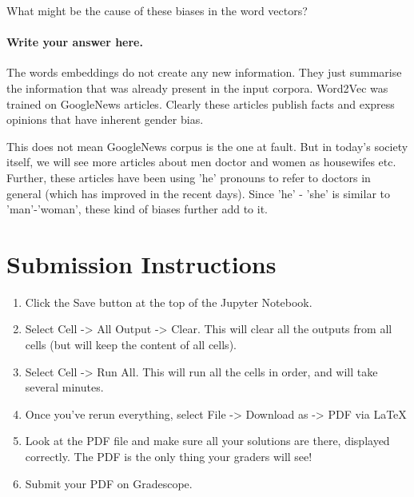 \documentclass[11pt]{article}
\providecommand{\tightlist}{%
      \setlength{\itemsep}{0pt}\setlength{\parskip}{0pt}}
\begin{document}
What might be the cause of these biases in the word vectors?

    \paragraph{Write your answer here.}\label{write-your-answer-here.}

The words embeddings do not create any new information. They just
summarise the information that was already present in the input corpora.
Word2Vec was trained on GoogleNews articles. Clearly these articles
publish facts and express opinions that have inherent gender bias.

This does not mean GoogleNews corpus is the one at fault. But in today's
society itself, we will see more articles about men doctor and women as
housewifes etc. Further, these articles have been using 'he' pronouns to
refer to doctors in general (which has improved in the recent days).
Since 'he' - 'she' is similar to 'man'-'woman', these kind of biases
further add to it.

    \section{ Submission Instructions}\label{submission-instructions}

\begin{enumerate}
\def\labelenumi{\arabic{enumi}.}
\tightlist
\item
  Click the Save button at the top of the Jupyter Notebook.
\item
  Select Cell -\textgreater{} All Output -\textgreater{} Clear. This
  will clear all the outputs from all cells (but will keep the content
  of all cells).
\item
  Select Cell -\textgreater{} Run All. This will run all the cells in
  order, and will take several minutes.
\item
  Once you've rerun everything, select File -\textgreater{} Download as
  -\textgreater{} PDF via LaTeX
\item
  Look at the PDF file and make sure all your solutions are there,
  displayed correctly. The PDF is the only thing your graders will see!
\item
  Submit your PDF on Gradescope.
\end{enumerate}


    
    
    
    
\end{document}
